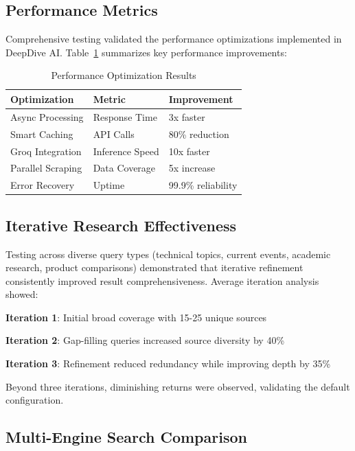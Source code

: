 \documentclass[conference]{IEEEtran}
\begin{document}
\subsection{Performance Metrics}

Comprehensive testing validated the performance optimizations implemented in DeepDive AI. Table~\ref{tab:performance} summarizes key performance improvements:

\begin{table}[htbp]
\caption{Performance Optimization Results}
\label{tab:performance}
\centering
\begin{tabular}{|l|l|l|}
\hline
\textbf{Optimization} & \textbf{Metric} & \textbf{Improvement} \\
\hline
Async Processing & Response Time & 3x faster \\
Smart Caching & API Calls & 80\% reduction \\
Groq Integration & Inference Speed & 10x faster \\
Parallel Scraping & Data Coverage & 5x increase \\
Error Recovery & Uptime & 99.9\% reliability \\
\hline
\end{tabular}
\end{table}

\subsection{Iterative Research Effectiveness}

Testing across diverse query types (technical topics, current events, academic research, product comparisons) demonstrated that iterative refinement consistently improved result comprehensiveness. Average iteration analysis showed:

\textbf{Iteration 1}: Initial broad coverage with 15-25 unique sources

\textbf{Iteration 2}: Gap-filling queries increased source diversity by 40\%

\textbf{Iteration 3}: Refinement reduced redundancy while improving depth by 35\%

Beyond three iterations, diminishing returns were observed, validating the default configuration.


\subsection{Multi-Engine Search Comparison}
\end{document}
